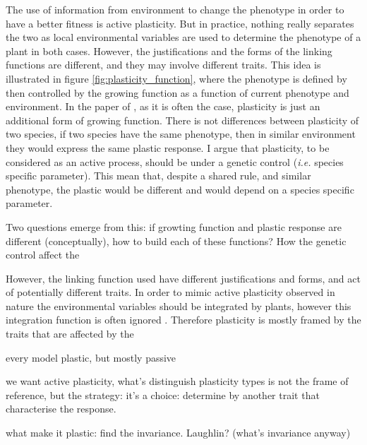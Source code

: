 The use of information from environment to change the phenotype in order to have a better fitness is active plasticity. But in practice, nothing really separates the two as local environmental variables are used to determine the phenotype of a plant in both cases. However, the justifications and the forms of the linking functions are different, and they may involve different traits. This idea is illustrated in figure \ref{fig:plasticity_function}, where the phenotype is defined by then controlled by the growing function as a function of current phenotype and environment. In the paper of \cite{maire_plasticity_2013}, as it is often the case, plasticity is just an additional form of growing function. There is not differences between plasticity of two species, if two species have the same phenotype, then in similar environment they would express the same plastic response. I argue that plasticity, to be considered as an active process, should be under a genetic control (\textit{i.e.} species specific parameter). This mean that, despite a shared rule, and similar phenotype, the plastic would be different and would depend on a species specific parameter.

Two questions emerge from this: if growting function and plastic response are different (conceptually), how to build each of these functions?
How the genetic control affect the 

However, the linking function used have different justifications and forms, and act of potentially different traits. In order to mimic active plasticity observed in nature the environmental variables should be integrated by plants, however this integration function is often ignored \cite{maire_plasticity_2013}. Therefore plasticity is mostly framed by the traits that are affected by the 




every model plastic, but mostly passive

we want active plasticity, what's distinguish plasticity types is not the frame of reference, but the strategy: it's a choice: determine by another trait that characterise the response.

what make it plastic: find the invariance. Laughlin? (what's invariance anyway)

